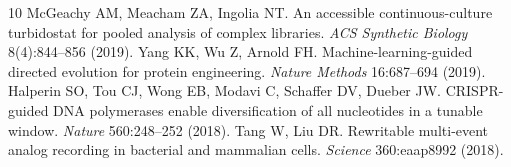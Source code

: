 \documentclass[11pt,a4paper]{article}
\begin{document}
\begin{thebibliography}{10}
 McGeachy AM, Meacham ZA, Ingolia NT. An accessible continuous-culture
  turbidostat for pooled analysis of complex libraries. \textit{ACS Synthetic Biology}
  8(4):844--856 (2019).
 Yang KK, Wu Z, Arnold FH. Machine-learning-guided directed evolution for
  protein engineering. \textit{Nature Methods} 16:687--694 (2019).
 Halperin SO, Tou CJ, Wong EB, Modavi C, Schaffer DV, Dueber JW.
  CRISPR-guided DNA polymerases enable diversification of all nucleotides in a tunable window.
  \textit{Nature} 560:248--252 (2018).
 Tang W, Liu DR. Rewritable multi-event analog recording in bacterial and
  mammalian cells. \textit{Science} 360:eaap8992 (2018).
\end{thebibliography}
\end{document}
